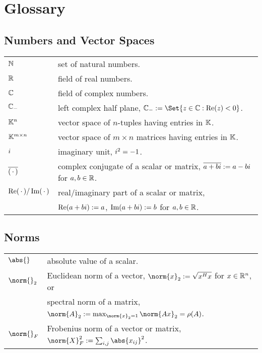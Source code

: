 \chapter*{Glossary}
\printglossary[title=Abbreviations]


\section*{Numbers and Vector Spaces}

\noindent
\begin{tabular}{@{}p{2.5cm}l}
  $\mathbb{N}$ & set of natural numbers. \\
  $\mathbb{R}$ & field of real numbers. \\
  $\mathbb{C}$ & field of complex numbers. \\
  $\mathbb{C}_-$ & left complex half plane, $\Cneg := \Set{z\in\C : \Re(z) < 0}$. \\
  $\mathbb{K}^n$ & vector space of $n$-tuples having entries in $\mathbb{K}$. \\
  $\mathbb{K}^{m\times n}$ & vector space of $m\times n$ matrices having entries in $\mathbb{K}$. \\
  $i$ & imaginary unit, $i^2 = -1$. \\
  $\conj{(\optional{})}$ & complex conjugate of a scalar or matrix, $\conj{a + b\im} := a - b\im$ for $a,b\in\mathbb{R}$. \\
  $\Re(\optional{}) / \Im(\optional{})$ & real/imaginary part of a scalar or matrix, \\
    & $\operatorname{Re}(a + b i) := a$, $\operatorname{Im}(a+bi) := b$ for $a, b\in\mathbb{R}$.
\end{tabular}

\section*{Norms}

\noindent
\begin{tabular}{@{}p{2.5cm}l}
  $\abs{}$ & absolute value of a scalar. \\
  $\norm{}_2$ & Euclidean norm of a vector, $\norm{x}_2 := \sqrt{x^\HT x}$ for $x\in\mathbb{R}^n$, or \\
              & spectral norm of a matrix, $\norm{A}_2 := \max_{\norm{x}_2 = 1} \norm{Ax}_2 = \rho(A)$. \\
  $\norm{}_F$ & Frobenius norm of a vector or matrix, $\norm{X}^2_F := \sum_{i,j} \abs{x_{ij}}^2$.
\end{tabular}

